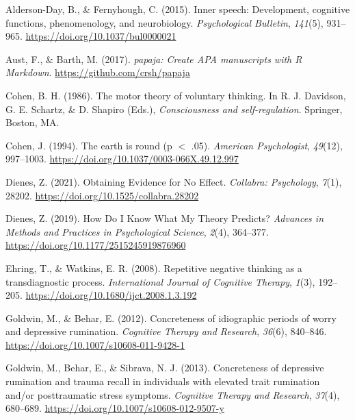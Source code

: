 \documentclass[
  english,
  man, donotrepeattitle,mask,floatsintext]{apa6}
\newlength{\cslhangindent}
\newlength{\cslentryspacingunit} %
\newenvironment{CSLReferences}[2] %
 {%
  \setlength{\parindent}{0pt}
  \ifodd #1
  \let\oldpar\par
  \def\par{\hangindent=\cslhangindent\oldpar}
  \fi
  \setlength{\parskip}{#2\cslentryspacingunit}
 }%
 {}
\begin{document}
\hypertarget{refs}{}
\begin{CSLReferences}{1}{0}
\leavevmode{}%
Alderson-Day, B., \& Fernyhough, C. (2015). Inner speech: Development, cognitive functions, phenomenology, and neurobiology. \emph{Psychological Bulletin}, \emph{141}(5), 931--965. \url{https://doi.org/10.1037/bul0000021}

\leavevmode{}%
Aust, F., \& Barth, M. (2017). \emph{{papaja}: {Create} {APA} manuscripts with {R Markdown}}. \url{https://github.com/crsh/papaja}

\leavevmode{}%
Cohen, B. H. (1986). The motor theory of voluntary thinking. In R. J. Davidson, G. E. Schartz, \& D. Shapiro (Eds.), \emph{Consciousness and self-regulation}. {Springer, Boston, MA}.

\leavevmode{}%
Cohen, J. (1994). The earth is round (p {\(<\)} .05). \emph{American Psychologist}, \emph{49}(12), 997--1003. \url{https://doi.org/10.1037/0003-066X.49.12.997}

\leavevmode{}%
Dienes, Z. (2021). Obtaining {Evidence} for {No Effect}. \emph{Collabra: Psychology}, \emph{7}(1), 28202. \url{https://doi.org/10.1525/collabra.28202}

\leavevmode{}%
Dienes, Z. (2019). How {Do I Know What My Theory Predicts}? \emph{Advances in Methods and Practices in Psychological Science}, \emph{2}(4), 364--377. \url{https://doi.org/10.1177/2515245919876960}

\leavevmode{}%
Ehring, T., \& Watkins, E. R. (2008). Repetitive negative thinking as a transdiagnostic process. \emph{International Journal of Cognitive Therapy}, \emph{1}(3), 192--205. \url{https://doi.org/10.1680/ijct.2008.1.3.192}

\leavevmode{}%
Goldwin, M., \& Behar, E. (2012). Concreteness of idiographic periods of worry and depressive rumination. \emph{Cognitive Therapy and Research}, \emph{36}(6), 840--846. \url{https://doi.org/10.1007/s10608-011-9428-1}

\leavevmode{}%
Goldwin, M., Behar, E., \& Sibrava, N. J. (2013). Concreteness of depressive rumination and trauma recall in individuals with elevated trait rumination and/or posttraumatic stress symptoms. \emph{Cognitive Therapy and Research}, \emph{37}(4), 680--689. \url{https://doi.org/10.1007/s10608-012-9507-y}


\end{CSLReferences}
\end{document}
